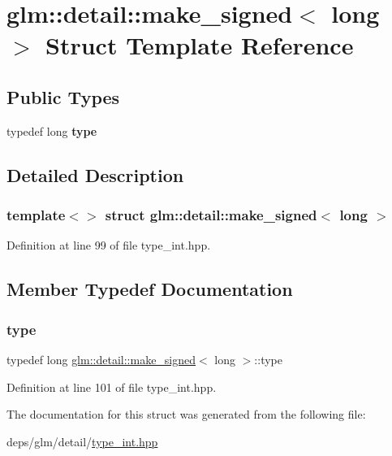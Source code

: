 \hypertarget{structglm_1_1detail_1_1make__signed_3_01long_01_4}{}\section{glm\+:\+:detail\+:\+:make\+\_\+signed$<$ long $>$ Struct Template Reference}
\label{structglm_1_1detail_1_1make__signed_3_01long_01_4}
\subsection*{Public Types}
\begin{DoxyCompactItemize}
\item 
\mbox{\label{structglm_1_1detail_1_1make__signed_3_01long_01_4_ab9807f0a681192166dd820195c967222}} 
typedef long {\bfseries type}
\end{DoxyCompactItemize}


\subsection{Detailed Description}
\subsubsection*{template$<$$>$\newline
struct glm\+::detail\+::make\+\_\+signed$<$ long $>$}



Definition at line 99 of file type\+\_\+int.\+hpp.



\subsection{Member Typedef Documentation}
\mbox{\label{structglm_1_1detail_1_1make__signed_3_01long_01_4_ab9807f0a681192166dd820195c967222}} 
\subsubsection{\texorpdfstring{type}{type}}
{\footnotesize\ttfamily typedef long \hyperlink{structglm_1_1detail_1_1make__signed}{glm\+::detail\+::make\+\_\+signed}$<$ long $>$\+::type}



Definition at line 101 of file type\+\_\+int.\+hpp.



The documentation for this struct was generated from the following file\+:\begin{DoxyCompactItemize}
\item 
deps/glm/detail/\hyperlink{type__int_8hpp}{type\+\_\+int.\+hpp}\end{DoxyCompactItemize}
